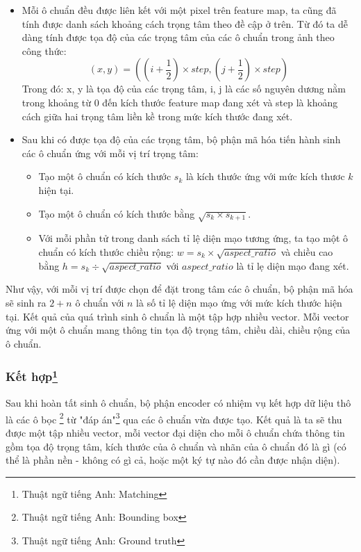 \documentclass[a4paper,12pt]{article}
\begin{document}
	\begin{itemize}
		
		\item Mỗi ô chuẩn đều được liên kết với một pixel trên feature map, ta cũng đã tính được danh sách khoảng cách trọng tâm theo đề cập ở trên. Từ đó ta dễ dàng tính được tọa độ của các trọng tâm của các ô chuẩn trong ảnh theo công thức:
		$$ (x, y) =\left( \left(i + \frac{1}{2} \right) \times step, \left(j + \frac{1}{2} \right) \times step \right)$$
		Trong đó: x, y là tọa độ của các trọng tâm, i, j là các số nguyên dương nằm trong khoảng từ 0 đến kích thước feature map đang xét và step là khoảng cách giữa hai trọng tâm liền kề trong mức kích thước đang xét.
		
		\item Sau khi có được tọa độ của các trọng tâm, bộ phận mã hóa tiến hành sinh các ô chuẩn ứng với mỗi vị trí trọng tâm: 
		
		\begin{itemize}
			\item Tạo một ô chuẩn có kích thước $s_k$ là kích thước ứng với mức kích thươc $k$ hiện tại.
			\item Tạo một ô chuẩn có kích thước bằng $\sqrt{s_k \times s_{k + 1}}$.
			\item Với mỗi phần tử trong danh sách tỉ lệ diện mạo tương ứng, ta tạo một ô chuẩn có kích thước chiều rộng: $w = s_k \times \sqrt{aspect\_ratio}$ và chiều cao bằng $h = s_k \div \sqrt{aspect\_ratio}$ với $aspect\_ratio$ là tỉ lẹ diện mạo đang xét.
		\end{itemize}
		
	\end{itemize}
	
	Như vậy, với mỗi vị trí được chọn để đặt trong tâm các ô chuẩn, bộ phận mã hóa sẽ sinh ra $2 + n$ ô chuẩn với $n$ là số tỉ lệ diện mạo ứng với mức kích thước hiện tại. Kết quả của quá trình sinh ô chuẩn là một tập hợp nhiều vector. Mỗi vector ứng với một ô chuẩn mang thông tin tọa độ trọng tâm, chiều dài, chiều rộng của ô chuẩn.
	
	\subsubsection*{Kết hợp\footnote{Thuật ngữ tiếng Anh: Matching}}
	
	Sau khi hoàn tất sinh ô chuẩn, bộ phận encoder có nhiệm vụ kết hợp dữ liệu thô là các ô bọc \footnote{Thuật ngữ tiếng Anh: Bounding box} từ "đáp án"\footnote{Thuật ngữ tiếng Anh: Ground truth} qua các ô chuẩn vừa được tạo. Kết quả là ta sẽ thu được một tập nhiều vector, mỗi vector đại diện cho mỗi ô chuẩn chứa thông tin gồm tọa độ trọng tâm, kích thước của ô chuẩn và nhãn của ô chuẩn đó là gì (có thể là phần nền - không có gì cả, hoặc một ký tự nào đó cần được nhận diện). \\
	
\end{document}
